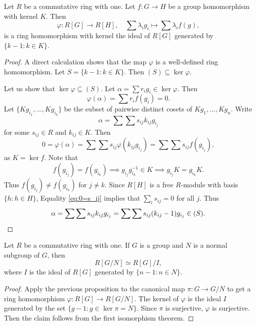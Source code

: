 
\begin{proposition}
    \label{pro:augmentation}
    Let $R$ be a commutative ring with one. 
    Let $f\colon G\to H$ be a group homomorphism with kernel $K$. Then
    \[
    \varphi\colon R[G]\to R[H],
    \quad 
    \sum\lambda_ig_i\mapsto \sum\lambda_if(g),
    \]
    is a ring homomorphism with kernel the ideal 
    of $R[G]$ generated by $\{k-1:k\in K\}$. 
\end{proposition}

\begin{proof}
    A direct calculation shows that the map $\varphi$ is a well-defined ring homomorphism. Let 
    $S=\{k-1:k\in K\}$. Then $(S)\subseteq \ker\varphi$. 
    
    Let us show that 
    $\ker\varphi\subseteq (S)$. Let $\alpha=\sum r_ig_i\in\ker\varphi$. Then 
    \[
    \varphi(\alpha)=\sum r_if(g_i)=0.
    \]
    Let 
    $\{Kg_{i_1},\dots,Kg_{i_k}\}$ be the subset of pairwise distinct cosets 
    of $Kg_1,\dots,Kg_n$. Write  
    \[
    \alpha=\sum\sum s_{ij}k_{ij}g_{i_j}
    \]
    for some $s_{ij}\in R$ and $k_{ij}\in K$. Then 
    \begin{equation}
    \label{eq:0=s_ij}
    0=\varphi(\alpha)=\sum\sum s_{ij}\varphi(k_{ij}g_{i_j})
    =\sum\sum s_{ij}f(g_{i_j}),
    \end{equation}
    as $K=\ker f$. Note that 
    \[
    f(g_{i_j})=f(g_{i_k})\implies 
    g_{i_j}g_{i_k}^{-1}\in K\implies 
    g_{i_j}K=g_{i_k}K.
    \]
    Thus $f(g_{i_j})\ne f(g_{i_k})$ for $j\ne k$. Since $R[H]$ is a free $R$-module 
    with basis $\{h:h\in H\}$, Equality
    \eqref{eq:0=s_ij}
    implies that $\sum_i s_{ij}=0$ for all $j$. Thus
    \[
    \alpha=\sum\sum s_{ij}k_{ij}g_{i_j}=\sum\sum s_{ij}(k_{ij}-1)g_{i_j}\in (S).\qedhere
    \]
\end{proof}

\begin{corollary}
\label{cor:R[G/N]}
    Let $R$ be a commutative ring with one. If 
    $G$ is a group and $N$ is a normal subgroup of $G$, then
    \[
    R[G/N]\simeq R[G]/I,
    \]
    where $I$ is the ideal of $R[G]$ generated by $\{n-1:n\in N\}$. 
\end{corollary}

\begin{proof}
    Apply the previous proposition to the canonical map $\pi\colon G\to G/N$ to get
    a ring homomorphism $\varphi\colon R[G]\to R[G/N]$. The kernel of $\varphi$ is the ideal $I$ 
    generated by the set $\{g-1:g\in\ker\pi=N\}$. Since 
    $\pi$ is surjective, $\varphi$ is surjective. Then 
    the claim follows from the first isomorphism theorem. 
\end{proof}

